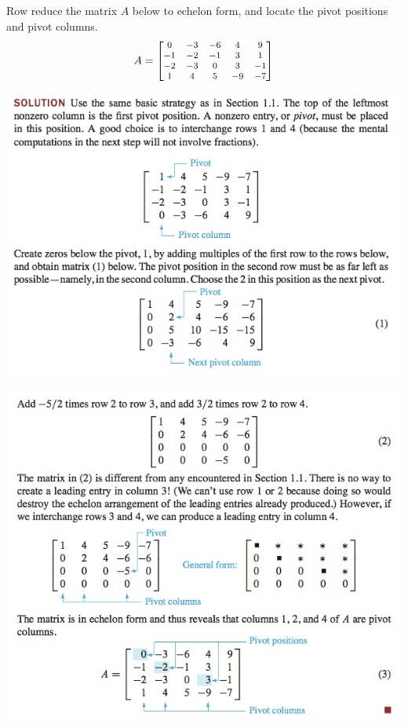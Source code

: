 \documentclass[12pt,letterpaper,reqno]{article}
\numberwithin{equation}{section}
\begin{document}
\begin{example}
	Row reduce the matrix $A$ below to echelon form, and locate the pivot positions and pivot columns.
\begin{align*}
	\footnotesize A=\begin{bmatrix}
		0 & -3 & -6 & 4 & 9 \\
		-1 & -2 & -1 & 3 & 1 \\
		-2 & -3 & 0 & 3 & -1 \\
		1 & 4 & 5 & -9 & -7 
	\end{bmatrix}
\end{align*}
\begin{center}
\includegraphics[scale=0.8]{figures_mvc/pivots_step_1}	
\end{center}

\begin{center}
\includegraphics[scale=0.8]{figures_mvc/pivots_step_2}	
\end{center}
\end{example}
\end{document}
